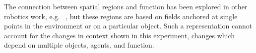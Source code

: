 \documentclass[11pt,letterpaper]{article}
\begin{document}
The connection between spatial regions and function has been explored in other robotics work, e.g. ~\cite{Karg:2012,Fasola:2013}, but these regions are based on fields anchored at single points in the environment or on a particular object. Such a representation cannot account for the changes in context shown in this experiment, changes which depend on multiple objects, agents, and function.


\end{document}
